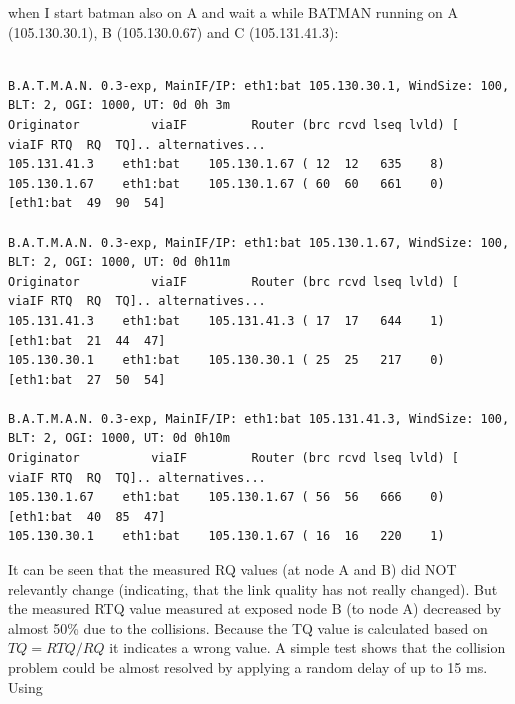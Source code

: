 \documentclass[11pt]{article}
\begin{document}
when I start batman also on A and wait a while
BATMAN running on A (105.130.30.1), B (105.130.0.67)  and C (105.131.41.3):

\begin{small}
\begin{verbatim}

B.A.T.M.A.N. 0.3-exp, MainIF/IP: eth1:bat 105.130.30.1, WindSize: 100, BLT: 2, OGI: 1000, UT: 0d 0h 3m
Originator          viaIF         Router (brc rcvd lseq lvld) [   viaIF RTQ  RQ  TQ].. alternatives...
105.131.41.3    eth1:bat    105.130.1.67 ( 12  12   635    8)
105.130.1.67    eth1:bat    105.130.1.67 ( 60  60   661    0) [eth1:bat  49  90  54]

B.A.T.M.A.N. 0.3-exp, MainIF/IP: eth1:bat 105.130.1.67, WindSize: 100, BLT: 2, OGI: 1000, UT: 0d 0h11m
Originator          viaIF         Router (brc rcvd lseq lvld) [   viaIF RTQ  RQ  TQ].. alternatives...
105.131.41.3    eth1:bat    105.131.41.3 ( 17  17   644    1) [eth1:bat  21  44  47]
105.130.30.1    eth1:bat    105.130.30.1 ( 25  25   217    0) [eth1:bat  27  50  54]

B.A.T.M.A.N. 0.3-exp, MainIF/IP: eth1:bat 105.131.41.3, WindSize: 100, BLT: 2, OGI: 1000, UT: 0d 0h10m
Originator          viaIF         Router (brc rcvd lseq lvld) [   viaIF RTQ  RQ  TQ].. alternatives...
105.130.1.67    eth1:bat    105.130.1.67 ( 56  56   666    0) [eth1:bat  40  85  47]
105.130.30.1    eth1:bat    105.130.1.67 ( 16  16   220    1)

\end{verbatim}
\end{small}

It can be seen that the measured RQ values (at node A and B) did NOT relevantly change (indicating, that the link quality has not really changed). But the measured RTQ value measured at exposed node B (to node A) decreased by almost 50\% due to the collisions.
Because the TQ value is calculated based on $TQ = RTQ / RQ$ it indicates
a wrong value.
%
A simple test shows that the collision problem could be almost resolved by applying a random delay of up to 15 ms. Using
\end{document}

